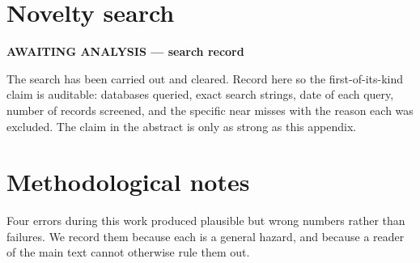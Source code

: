 \documentclass[11pt,onecolumn]{article}
\newif\ifdraft
\newenvironment{pendingbox}[1]
  {\par\vspace{3pt}\noindent
   \begin{lrbox}{\pendbox}\begin{minipage}{0.93\linewidth}\small
   \textcolor{PendFG}{\textbf{AWAITING ANALYSIS --- #1}}\par\vspace{3pt}
   \color{PendFG}}
  {\end{minipage}\end{lrbox}%
   \ifdraft\fcolorbox{PendFG}{PendBG}{\usebox{\pendbox}}\fi
   \par\vspace{4pt}}
\begin{document}
\section{Novelty search}\label{app:novelty}
\begin{pendingbox}{search record}
The search has been carried out and cleared. Record here so the
first-of-its-kind claim is auditable: databases queried, exact search
strings, date of each query, number of records screened, and the
specific near misses with the reason each was excluded. The claim in the
abstract is only as strong as this appendix.
\end{pendingbox}

\section{Methodological notes}\label{app:notes}
Four errors during this work produced plausible but wrong numbers rather
than failures. We record them because each is a general hazard, and
because a reader of the main text cannot otherwise rule them out.
\end{document}

